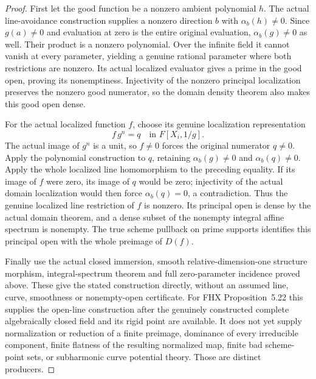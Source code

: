 \begin{proof}
First let the good function be a nonzero ambient polynomial $h$.
The actual line-avoidance construction supplies a nonzero direction
$b$ with $\alpha_b(h)\ne0$. Since $g(a)\ne0$ and evaluation at zero
is the entire original evaluation, $\alpha_b(g)\ne0$ as well.
Their product is a nonzero polynomial. Over the infinite field it cannot
vanish at every parameter, yielding a genuine rational parameter where
both restrictions are nonzero. Its actual localized evaluator gives a
prime in the good open, proving its nonemptiness. Injectivity of the
nonzero principal localization preserves the nonzero good numerator,
so the domain density theorem also makes this good open dense.

For the actual localized function $f$, choose its genuine localization
representation
\[
 f\,g^n=q\quad\text{in }F[X_i,1/g].
\]
The actual image of $g^n$ is a unit, so $f\ne0$ forces the original
numerator $q\ne0$. Apply the polynomial construction to $q$, retaining
$\alpha_b(g)\ne0$ and $\alpha_b(q)\ne0$. Apply the whole localized
line homomorphism to the preceding equality. If its image of $f$ were
zero, its image of $q$ would be zero; injectivity of the actual domain
localization would then force $\alpha_b(q)=0$, a contradiction.
Thus the genuine localized line restriction of $f$ is nonzero.
Its principal open is dense by the actual domain theorem, and a dense
subset of the nonempty integral affine spectrum is nonempty.
The true scheme pullback on prime supports identifies this principal
open with the whole preimage of $D(f)$.

Finally use the actual closed immersion, smooth relative-dimension-one
structure morphism, integral-spectrum theorem and full zero-parameter
incidence proved above. These give the stated construction directly,
without an assumed line, curve, smoothness or nonempty-open certificate.
For FHX Proposition~5.22 this supplies the open-line construction after
the genuinely constructed complete algebraically closed field and its
rigid point are available. It does not yet supply normalization or
reduction of a finite preimage, dominance of every irreducible component,
finite flatness of the resulting normalized map, finite bad scheme-point
sets, or subharmonic curve potential theory. Those are distinct producers.
\end{proof}

